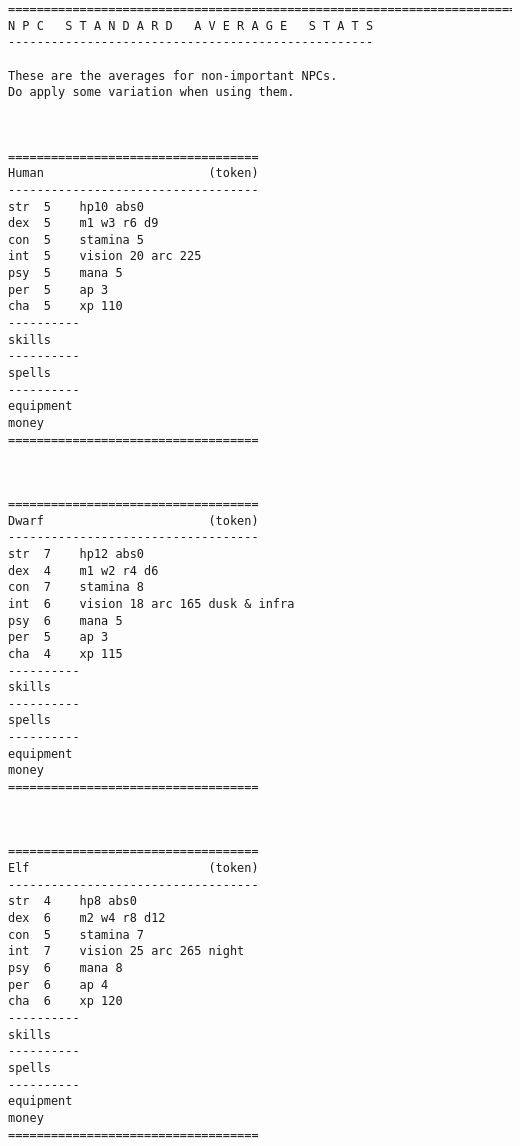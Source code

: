  {}
\goodbreak \small \begin{samepage} \begin{verbatim}
================================================================================
N P C   S T A N D A R D   A V E R A G E   S T A T S
---------------------------------------------------

These are the averages for non-important NPCs.
Do apply some variation when using them.
\end{verbatim} \normalsize

\

\small \begin{verbatim}
===================================
Human                       (token)
-----------------------------------
str  5    hp10 abs0
dex  5    m1 w3 r6 d9
con  5    stamina 5
int  5    vision 20 arc 225
psy  5    mana 5
per  5    ap 3
cha  5    xp 110
----------
skills
----------
spells
----------
equipment
money
===================================
\end{verbatim} \end{samepage} \normalsize

\

\goodbreak \small \begin{samepage} \begin{verbatim}
===================================
Dwarf                       (token)
-----------------------------------
str  7    hp12 abs0
dex  4    m1 w2 r4 d6
con  7    stamina 8
int  6    vision 18 arc 165 dusk & infra
psy  6    mana 5
per  5    ap 3
cha  4    xp 115
----------
skills
----------
spells
----------
equipment
money
===================================
\end{verbatim} \end{samepage} \normalsize

\

\goodbreak \small \begin{samepage} \begin{verbatim}
===================================
Elf                         (token)
-----------------------------------
str  4    hp8 abs0
dex  6    m2 w4 r8 d12
con  5    stamina 7
int  7    vision 25 arc 265 night
psy  6    mana 8
per  6    ap 4
cha  6    xp 120
----------
skills
----------
spells
----------
equipment
money
===================================
\end{verbatim} \end{samepage} \normalsize

